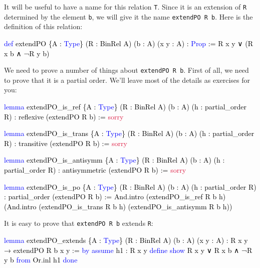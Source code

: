\documentclass[
  letterpaper,
  DIV=11,
  numbers=noendperiod]{scrreprt}
\newenvironment{Shaded}{\begin{snugshade}}{\end{snugshade}}
\newcommand{\ConstantTok}[1]{\textcolor[rgb]{0.56,0.35,0.01}{#1}}
\newcommand{\KeywordTok}[1]{\textcolor[rgb]{0.00,0.23,0.31}{#1}}
\newcommand{\NormalTok}[1]{\textcolor[rgb]{0.00,0.23,0.31}{#1}}
\renewcommand{\NormalTok}[1]{\textcolor[HTML]{000000}{#1}}
\renewcommand{\KeywordTok}[1]{\textcolor[HTML]{0000FF}{#1}}
\renewcommand{\ConstantTok}[1]{\textcolor[HTML]{DC143C}{#1}}
\theoremstyle{remark}
\begin{document}
It will be useful to have a name for this relation \texttt{T}. Since it
is an extension of \texttt{R} determined by the element \texttt{b}, we
will give it the name \texttt{extendPO\ R\ b}. Here is the definition of
this relation:

\begin{Shaded}
\begin{Highlighting}[]
\KeywordTok{def}\NormalTok{ extendPO \{A : }\KeywordTok{Type}\NormalTok{\} (R : BinRel A) (b : A) (x y : A) : }\KeywordTok{Prop}\NormalTok{ :=}
\NormalTok{  R x y ∨ (R x b ∧ ¬R y b)}
\end{Highlighting}
\end{Shaded}

We need to prove a number of things about \texttt{extendPO\ R\ b}. First
of all, we need to prove that it is a partial order. We'll leave most of
the details as exercises for you:

\begin{Shaded}
\begin{Highlighting}[]
\KeywordTok{lemma}\NormalTok{ extendPO\_is\_ref \{A : }\KeywordTok{Type}\NormalTok{\} (R : BinRel A) (b : A)}
\NormalTok{    (h : partial\_order R) : reflexive (extendPO R b) := }\ConstantTok{sorry}

\KeywordTok{lemma}\NormalTok{ extendPO\_is\_trans \{A : }\KeywordTok{Type}\NormalTok{\} (R : BinRel A) (b : A)}
\NormalTok{    (h : partial\_order R) : transitive (extendPO R b) := }\ConstantTok{sorry}

\KeywordTok{lemma}\NormalTok{ extendPO\_is\_antisymm \{A : }\KeywordTok{Type}\NormalTok{\} (R : BinRel A) (b : A)}
\NormalTok{    (h : partial\_order R) : antisymmetric (extendPO R b) := }\ConstantTok{sorry}

\KeywordTok{lemma}\NormalTok{ extendPO\_is\_po \{A : }\KeywordTok{Type}\NormalTok{\} (R : BinRel A) (b : A)}
\NormalTok{    (h : partial\_order R) : partial\_order (extendPO R b) := }
\NormalTok{  And.intro (extendPO\_is\_ref R b h)}
\NormalTok{    (And.intro (extendPO\_is\_trans R b h) (extendPO\_is\_antisymm R b h))}
\end{Highlighting}
\end{Shaded}

It is easy to prove that \texttt{extendPO\ R\ b} extends \texttt{R}:

\begin{Shaded}
\begin{Highlighting}[]
\KeywordTok{lemma}\NormalTok{ extendPO\_extends \{A : }\KeywordTok{Type}\NormalTok{\} (R : BinRel A) (b : A) (x y : A) :}
\NormalTok{    R x y → extendPO R b x y := }\KeywordTok{by}
  \KeywordTok{assume}\NormalTok{ h1 : R x y}
  \KeywordTok{define}
  \KeywordTok{show}\NormalTok{ R x y ∨ R x b ∧ ¬R y b }\KeywordTok{from}\NormalTok{ Or.inl h1}
  \KeywordTok{done}
\end{Highlighting}
\end{Shaded}
\end{document}
